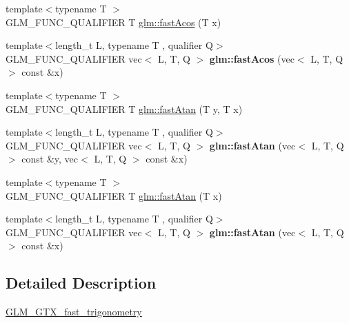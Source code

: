 \begin{DoxyCompactItemize}
{\footnotesize template$<$typename T $>$ }\\G\+L\+M\+\_\+\+F\+U\+N\+C\+\_\+\+Q\+U\+A\+L\+I\+F\+I\+ER T \hyperlink{group__gtx__fast__trigonometry_ga9721d63356e5d94fdc4b393a426ab26b}{glm\+::fast\+Acos} (T x)
\item 
\mbox{\label{fast__trigonometry_8inl_ae3688eb19af1c7efa981e983fee56340}} 
{\footnotesize template$<$length\+\_\+t L, typename T , qualifier Q$>$ }\\G\+L\+M\+\_\+\+F\+U\+N\+C\+\_\+\+Q\+U\+A\+L\+I\+F\+I\+ER vec$<$ L, T, Q $>$ {\bfseries glm\+::fast\+Acos} (vec$<$ L, T, Q $>$ const \&x)
\item 
{\footnotesize template$<$typename T $>$ }\\G\+L\+M\+\_\+\+F\+U\+N\+C\+\_\+\+Q\+U\+A\+L\+I\+F\+I\+ER T \hyperlink{group__gtx__fast__trigonometry_ga8d197c6ef564f5e5d59af3b3f8adcc2c}{glm\+::fast\+Atan} (T y, T x)
\item 
\mbox{\label{fast__trigonometry_8inl_ac18dd649f172f948924f711c796a4d3d}} 
{\footnotesize template$<$length\+\_\+t L, typename T , qualifier Q$>$ }\\G\+L\+M\+\_\+\+F\+U\+N\+C\+\_\+\+Q\+U\+A\+L\+I\+F\+I\+ER vec$<$ L, T, Q $>$ {\bfseries glm\+::fast\+Atan} (vec$<$ L, T, Q $>$ const \&y, vec$<$ L, T, Q $>$ const \&x)
\item 
{\footnotesize template$<$typename T $>$ }\\G\+L\+M\+\_\+\+F\+U\+N\+C\+\_\+\+Q\+U\+A\+L\+I\+F\+I\+ER T \hyperlink{group__gtx__fast__trigonometry_gae25de86a968490ff56856fa425ec9d30}{glm\+::fast\+Atan} (T x)
\item 
\mbox{\label{fast__trigonometry_8inl_a3454e48a4d7550d56d91858645bf2928}} 
{\footnotesize template$<$length\+\_\+t L, typename T , qualifier Q$>$ }\\G\+L\+M\+\_\+\+F\+U\+N\+C\+\_\+\+Q\+U\+A\+L\+I\+F\+I\+ER vec$<$ L, T, Q $>$ {\bfseries glm\+::fast\+Atan} (vec$<$ L, T, Q $>$ const \&x)
\end{DoxyCompactItemize}


\subsection{Detailed Description}
\hyperlink{group__gtx__fast__trigonometry}{G\+L\+M\+\_\+\+G\+T\+X\+\_\+fast\+\_\+trigonometry} 